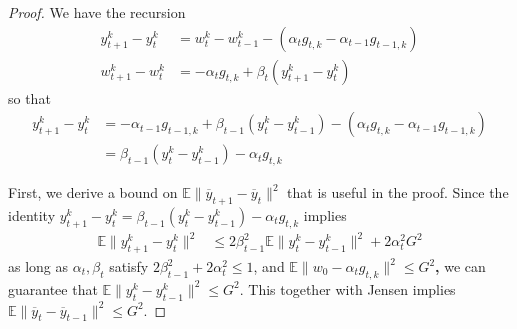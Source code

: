 \begin{proof}
	We have the recursion 
	\begin{align*}
	y_{t+1}^{k}-y_{t}^{k} & =w_{t}^{k}-w_{t-1}^{k}-(\alpha_{t}g_{t,k}-\alpha_{t-1}g_{t-1,k})\\
	w_{t+1}^{k}-w_{t}^{k} & =-\alpha_{t}g_{t,k}+\beta_{t}(y_{t+1}^{k}-y_{t}^{k})
	\end{align*}
	so that 
	\begin{align*}
	y_{t+1}^{k}-y_{t}^{k} & =-\alpha_{t-1}g_{t-1,k}+\beta_{t-1}(y_{t}^{k}-y_{t-1}^{k})-(\alpha_{t}g_{t,k}-\alpha_{t-1}g_{t-1,k})\\
	& =\beta_{t-1}(y_{t}^{k}-y_{t-1}^{k})-\alpha_{t}g_{t,k}
	\end{align*}
	
	First, we derive a bound on $\mathbb{E}\|\overline{y}_{t+1}-\overline{y}_{t}\|^{2}$
	that is useful in the proof. Since the identity $y_{t+1}^{k}-y_{t}^{k}=\beta_{t-1}(y_{t}^{k}-y_{t-1}^{k})-\alpha_{t}g_{t,k}$
	implies 
	\begin{align*}
	\mathbb{E}\|y_{t+1}^{k}-y_{t}^{k}\|^{2} & \leq2\beta_{t-1}^{2}\mathbb{E}\|y_{t}^{k}-y_{t-1}^{k}\|^{2}+2\alpha_{t}^{2}G^{2}
	\end{align*}
	as long as $\alpha_{t},\beta_{t}$ satisfy $2\beta_{t-1}^{2}+2\alpha_{t}^{2}\leq1$,
	and\textbf{ $\mathbb{E}\|w_{0}-\alpha_{t}g_{t,k}\|^{2}\leq G^{2}$,}
	we can guarantee that $\mathbb{E}\|y_{t}^{k}-y_{t-1}^{k}\|^{2}\leq G^{2}$.
	This together with Jensen implies $\mathbb{E}\|\overline{y}_{t}-\overline{y}_{t-1}\|^{2}\leq G^{2}$. 
	

\end{proof}

